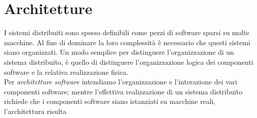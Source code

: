 \label{capitolo2}
\section{Architetture}
I sistemi distribuiti sono spesso definibili come pezzi di software sparsi su molte macchine. Al fine di dominare la loro complessità è necessario che questi sistemi siano organizzati. Un modo semplice per distinguere l'organizzazione di un sistema distribuito, è quello di distinguere l'organizzazione logica dei componenti software e la relativa realizzazione fisica.\\
Per \emph{architetture software} intendiamo l'organizzazione e l'interazione dei vari componenti software; mentre l'effettiva realizzazione di un sistema distribuito richiede che i componenti software siano istanziati su macchine reali, l'architettura risulta